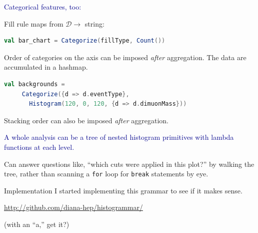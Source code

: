 \documentclass{beamer}
\begin{document}
\begin{frame}[fragile]{}
\textcolor{darkblue}{\large Categorical features, too:}

\vfill
Fill rule maps from $\mathcal{D} \to$ string:
\begin{lstlisting}[language=scala]
val bar_chart = Categorize(fillType, Count())
\end{lstlisting}
Order of categories on the axis can be imposed {\it after} aggregation. The data are accumulated in a hashmap.

\vfill
\begin{lstlisting}[language=scala]
val backgrounds =
     Categorize({d => d.eventType},
       Histogram(120, 0, 120, {d => d.dimuonMass}))
\end{lstlisting}

Stacking order can also be imposed {\it after} aggregation.
\end{frame}

\begin{frame}{}
\textcolor{darkblue}{\large A whole analysis can be a tree of nested histogram primitives with lambda functions at each level.}

\vfill
{}

\vfill
Can answer questions like, ``which cuts were applied in this plot?'' by walking the tree, rather than scanning a {\tt \small for} loop for {\tt \small break} statements by eye.
\end{frame}

\begin{frame}{Implementation}
I started implementing this grammar to see if it makes sense.

\begin{center}
\textcolor{blue}{\url{http://github.com/diana-hep/histogrammar/}}
\end{center}

(with an ``a,'' get it?)
\end{frame}
\end{document}
